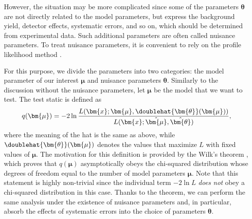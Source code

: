 \documentclass[12pt,twoside,book]{article}
\begin{document}
However, the situation may be more complicated since some of the parameters $\bm{\theta}$ are not directly related to the model parameters, but express the background yield, detector effects, systematic errors, and so on, which should be determined from experimental data.
Such additional parameters are often called nuisance parameters.
To treat nuisance parameters, it is convenient to rely on the profile likelihood method \cite{Cowan:2010js}.

For this purpose, we divide the parameters into two categories: the model parameter of our interest $\bm{\mu}$ and nuisance parameters $\bm{\theta}$.
Similarly to the discussion without the nuisance parameters, let $\bm{\mu}$ be the model that we want to test.
The test static is defined as
\begin{align}
  q (\bm{\mu}) =
  -2 \ln \frac{L(\bm{x} ; \bm{\mu}, \doublehat{\bm{\theta}} (\bm{\mu}))}
  {L(\bm{x} ; \hat{\bm{\mu}}, \hat{\bm{\theta}})},
\end{align}
where the meaning of the hat is the same as above, while $\doublehat{\bm{\theta}} (\bm{\mu})$ denotes the values that maximize $L$ with fixed values of $\bm{\mu}$.
The motivation for this definition is provided by the Wilk's theorem \cite{wilks1938}, which proves that $q (\bm{\mu})$ asymptotically obeys the chi-squared distribution whose degrees of freedom equal to the number of model parameters $\bm{\mu}$.
Note that this statement is highly non-trivial since the individual term $-2\ln L$ \textit{does not} obey a chi-squared distribution in this case.
Thanks to the theorem, we can perform the same analysis under the existence of nuisance parameters and, in particular, absorb the effects of systematic errors into the choice of parameters $\bm{\theta}$.



% 
% 
\end{document}
